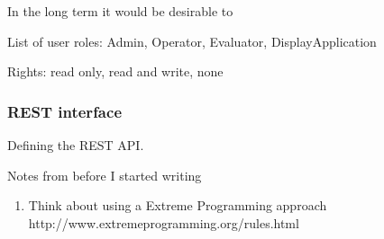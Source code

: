 In the long term it would be desirable to 

List of user roles: Admin, Operator, Evaluator, DisplayApplication

Rights: read only,  read and write, none



\subsubsection{REST interface}

Defining the REST API. 


Notes from before I started writing
\begin{enumerate}
\item Think about using a Extreme Programming approach http://www.extremeprogramming.org/rules.html
\end{enumerate}